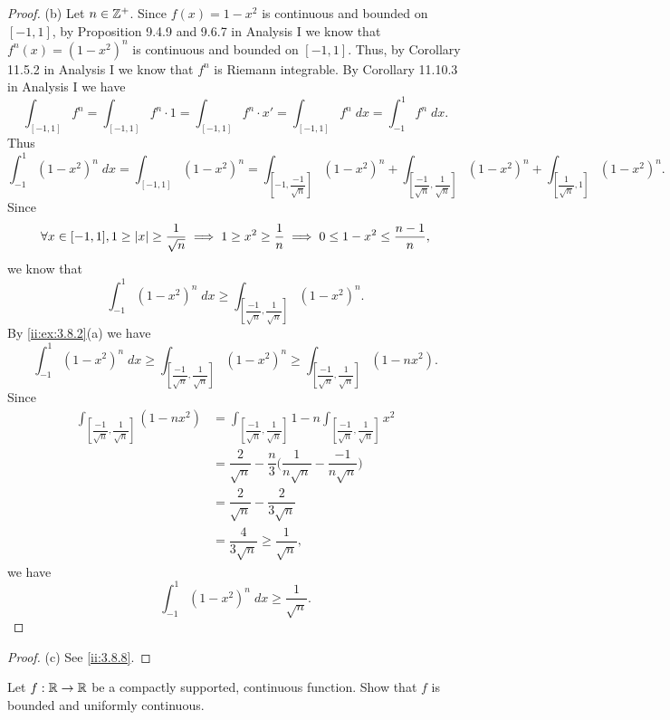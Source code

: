 \begin{proof}{(b)}
  Let \(n \in \mathbb{Z}^+\).
  Since \(f(x) = 1 - x^2\) is continuous and bounded on \([-1, 1]\), by Proposition 9.4.9 and 9.6.7 in Analysis I we know that \(f^n(x) = (1 - x^2)^n\) is continuous and bounded on \([-1, 1]\).
  Thus, by Corollary 11.5.2 in Analysis I we know that \(f^n\) is Riemann integrable.
  By Corollary 11.10.3 in Analysis I we have
  \[
    \int_{[-1, 1]} f^n = \int_{[-1, 1]} f^n \cdot 1 = \int_{[-1, 1]} f^n \cdot x' = \int_{[-1, 1]} f^n \; dx = \int_{-1}^1 f^n \; dx.
  \]
  Thus
  \[
    \int_{-1}^1 (1 - x^2)^n \; dx = \int_{[-1, 1]} (1 - x^2)^n = \int_{[-1, \dfrac{-1}{\sqrt{n}}]} (1 - x^2)^n + \int_{[\dfrac{-1}{\sqrt{n}}, \dfrac{1}{\sqrt{n}}]} (1 - x^2)^n + \int_{[\dfrac{1}{\sqrt{n}}, 1]} (1 - x^2)^n.
  \]
  Since
  \[
    \forall x \in [-1, 1], 1 \geq \left\lvert x\right\rvert \geq \dfrac{1}{\sqrt{n}} \implies 1 \geq x^2 \geq \dfrac{1}{n} \implies 0 \leq 1 - x^2 \leq \dfrac{n - 1}{n},
  \]
  we know that
  \[
    \int_{-1}^1 (1 - x^2)^n \; dx \geq \int_{[\dfrac{-1}{\sqrt{n}}, \dfrac{1}{\sqrt{n}}]} (1 - x^2)^n.
  \]
  By \cref{ii:ex:3.8.2}(a) we have
  \[
    \int_{-1}^1 (1 - x^2)^n \; dx \geq \int_{[\dfrac{-1}{\sqrt{n}}, \dfrac{1}{\sqrt{n}}]} (1 - x^2)^n \geq \int_{[\dfrac{-1}{\sqrt{n}}, \dfrac{1}{\sqrt{n}}]} (1 - n x^2).
  \]
  Since
  \begin{align*}
    \int_{[\dfrac{-1}{\sqrt{n}}, \dfrac{1}{\sqrt{n}}]} (1 - n x^2) & = \int_{[\dfrac{-1}{\sqrt{n}}, \dfrac{1}{\sqrt{n}}]} 1 - n \int_{[\dfrac{-1}{\sqrt{n}}, \dfrac{1}{\sqrt{n}}]} x^2 \\
                                                                   & = \dfrac{2}{\sqrt{n}} - \dfrac{n}{3} \bigg(\dfrac{1}{n \sqrt{n}} - \dfrac{-1}{n \sqrt{n}}\bigg)                   \\
                                                                   & = \dfrac{2}{\sqrt{n}} - \dfrac{2}{3 \sqrt{n}}                                                                     \\
                                                                   & = \dfrac{4}{3 \sqrt{n}} \geq \dfrac{1}{\sqrt{n}},
  \end{align*}
  we have
  \[
    \int_{-1}^1 (1 - x^2)^n \; dx \geq \dfrac{1}{\sqrt{n}}.
  \]
\end{proof}

\begin{proof}{(c)}
  See \cref{ii:3.8.8}.
\end{proof}

\begin{ex}\label{ii:ex:3.8.3}
  Let \(f : \mathbb{R} \to \mathbb{R}\) be a compactly supported, continuous function.
  Show that \(f\) is bounded and uniformly continuous.
\end{ex}

